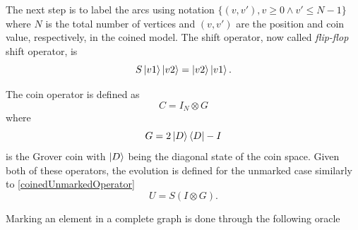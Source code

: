 \documentclass[../../dissertation.tex]{subfiles}
\begin{document}
%                
The next step is to label the arcs using notation $\{(v,v'), v \geqslant 0 \land v' \leqslant N-1\}$ 
where $N$ is the total number of vertices and $(v,v')$ are the position and coin value, respectively, in the coined model. 
The shift operator, now called \textit{flip-flop} shift operator, is
\begin{equation}
	S\ket{v1}\ket{v2} = \ket{v2}\ket{v1}.
	\label{eq:chap3FlipFlop}
\end{equation}\par
The coin operator is defined as
\begin{equation}
	C = I_N \otimes G
\end{equation}
where 
\begin{equation}
	G = 2\ket{D}\bra{D} - I
\end{equation}
is the Grover coin with $\ket{D}$ being the diagonal state of the coin space. Given both of these operators, the evolution is defined for the unmarked case similarly to \ref{coinedUnmarkedOperator}
\begin{equation}
	U = S(I \otimes G).
\end{equation}\par
Marking an element in a complete graph is done through the following oracle
\end{document}
